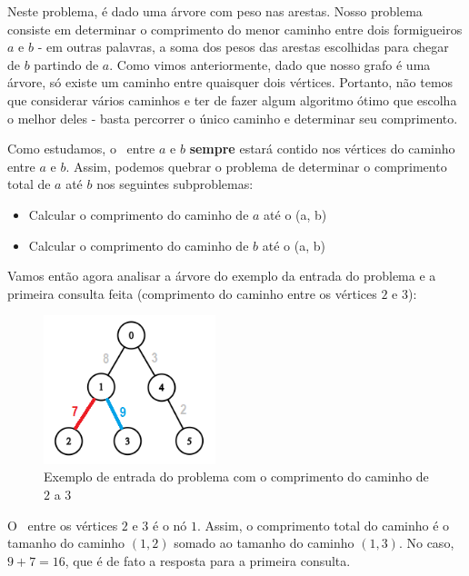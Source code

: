 \begin{mdframed}[backgroundcolor=blue!5]
\vspace{-0.4cm}
\end{mdframed}

\vspace{10cm}

Neste problema, é dado uma árvore com peso nas arestas. Nosso problema consiste em determinar o comprimento do menor caminho entre dois formigueiros $a$ e $b$ - em outras palavras, a soma dos pesos das arestas escolhidas para chegar de $b$ partindo de $a$. Como vimos anteriormente, dado que nosso grafo é uma árvore, só existe um caminho entre quaisquer dois vértices. Portanto, não temos que considerar vários caminhos e ter de fazer algum algoritmo ótimo que escolha o melhor deles - basta percorrer o único caminho e determinar seu comprimento.

Como estudamos, o \LCA\ entre $a$ e $b$ \textbf{sempre} estará contido nos vértices do caminho entre $a$ e $b$. Assim, podemos quebrar o problema de determinar o comprimento total de $a$ até $b$ nos seguintes subproblemas:

\begin{itemize}
    \item Calcular o comprimento do caminho de $a$ até o \LCA(a, b)
    \item Calcular o comprimento do caminho de $b$ até o \LCA(a, b)
\end{itemize}

Vamos então agora analisar a árvore do exemplo da entrada do problema e a primeira consulta feita (comprimento do caminho entre os vértices $2$ e $3$):

\begin{figure}[htb]
\begin{center}
\includegraphics[width=5cm]{images/ants10-graph.png}
\end{center}
\caption{\label{fig:arvore-euler2}Exemplo de entrada do problema com o comprimento do caminho de  $2$ a $3$}
\end{figure}

O \LCA\ entre os vértices $2$ e $3$ é o nó $1$. Assim, o comprimento total do caminho é o tamanho do caminho $(1, 2)$ somado ao tamanho do caminho $(1, 3)$. No caso, $9 + 7 = 16$, que é de fato a resposta para a primeira consulta.

